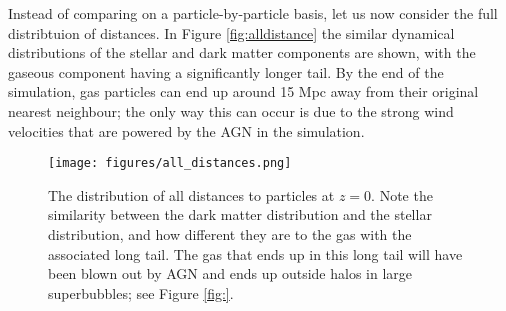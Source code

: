 Instead of comparing on a particle-by-particle basis, let us now consider the
full distribtuion of distances. In Figure \ref{fig:alldistance} the similar
dynamical distributions of the stellar and dark matter components are shown,
with the gaseous component having a significantly longer tail. By the end of
the simulation, gas particles can end up around 15 Mpc away from their original
nearest neighbour; the only way this can occur is due to the strong wind
velocities that are powered by the AGN in the simulation.

\begin{figure} \centering
	\texttt{[image: figures/all\_distances.png]}
	\caption{The distribution of all distances to particles at $z=0$. Note
	the similarity between the dark matter distribution and the stellar
	distribution, and how different they are to the gas with the associated
	long tail. The gas that ends up in this long tail will have been blown
	out by AGN and ends up outside halos in large superbubbles; see Figure
	\ref{fig:}.} \label{fig:alldistances} \end{figure}

